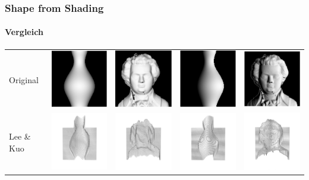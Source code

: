 \documentclass{beamer}
\begin{document}
\begin{frame}
	\frametitle{Shape from Shading}
	\framesubtitle{Vergleich}
	
	\begin{tabular}{lcccc}
		Original &
		\includegraphics[width=0.15\linewidth]{includes/vergleich/vorlage/vorlage_vase_001} & \includegraphics[width=0.15\linewidth]{includes/vergleich/vorlage/vorlage_mozart_001} &
		\includegraphics[width=0.15\linewidth]{includes/vergleich/vorlage/vorlage_vase_101} & \includegraphics[width=0.15\linewidth]{includes/vergleich/vorlage/vorlage_mozart_101} \\
		Lee \& Kuo &
		\includegraphics[width=0.15\linewidth]{includes/vergleich/lee_kuo/lee_kuo_vase_001} & \includegraphics[width=0.15\linewidth]{includes/vergleich/lee_kuo/lee_kuo_mozart_001} &
		\includegraphics[width=0.15\linewidth]{includes/vergleich/lee_kuo/lee_kuo_vase_101} & \includegraphics[width=0.15\linewidth]{includes/vergleich/lee_kuo/lee_kuo_mozart_101} \\

\end{tabular}
\end{frame}
\end{document}
